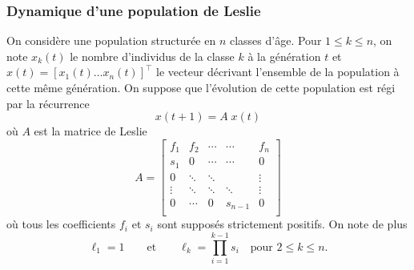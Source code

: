 \subsubsection{Dynamique d'une population de Leslie}


On considère une population structurée en $n$ classes d'âge. Pour $1 \leq k \leq n$, on note $x_k(t)$ le nombre d'individus de la classe $k$ à la génération $t$ et $x(t) = [x_1(t) \dots x_n(t)]^\top$ le vecteur décrivant l'ensemble de la population à cette même génération. On suppose que l'évolution de cette population est régi par la récurrence
\begin{equation} \label{eq:recurrenceLeslie}
  x(t+1) = A \; x(t)
\end{equation}
où $A$ est la matrice de Leslie
$$
A = \left[\begin{array}{cccccc}
            f_1 & f_2 & \cdots  & \cdots & f_n \\
            s_1 & 0 & \cdots  & \cdots & 0 \\
            0 & \ddots  & \ddots & & \vdots \\
            \vdots & \ddots & \ddots & \ddots & \vdots \\
            0 & \cdots & 0 & s_{n-1} & 0 \\
          \end{array}\right]
$$
où tous les coefficients $f_i$ et $s_i$ sont supposés strictement positifs. On note de plus
$$
\ell_1 = 1 \qquad \text{et} \qquad 
\ell_k = \prod_{i=1}^{k-1} s_i \quad \text{pour $2 \leq k \leq n$}.
$$

